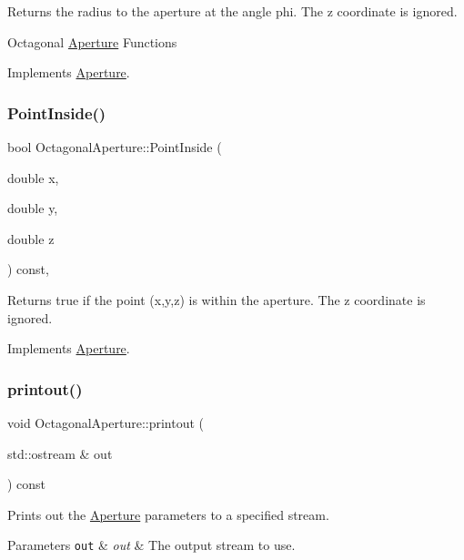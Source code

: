 Returns the radius to the aperture at the angle phi. The z coordinate is ignored.

Octagonal \hyperlink{classAperture}{Aperture} Functions 

Implements \hyperlink{classAperture_ad0ea7907d393ec1e6a8303343fe9dd29}{Aperture}.

\mbox{\label{classOctagonalAperture_a9c3e4ba8a96d3b97fc92fdeef975caf9}} 
\subsubsection{\texorpdfstring{Point\+Inside()}{PointInside()}}
{\footnotesize\ttfamily bool Octagonal\+Aperture\+::\+Point\+Inside (\begin{DoxyParamCaption}\item[{double}]{x,  }\item[{double}]{y,  }\item[{double}]{z }\end{DoxyParamCaption}) const\hspace{0.3cm}{\ttfamily [inline]}, {\ttfamily [virtual]}}

Returns true if the point (x,y,z) is within the aperture. The z coordinate is ignored. 

Implements \hyperlink{classAperture_a77854d058bf8a00cfeb7a6d766dc0028}{Aperture}.

\mbox{\label{classOctagonalAperture_ad8329324a912bc76c97fd3f8bbefa5ac}} 
\subsubsection{\texorpdfstring{printout()}{printout()}}
{\footnotesize\ttfamily void Octagonal\+Aperture\+::printout (\begin{DoxyParamCaption}\item[{std\+::ostream \&}]{out }\end{DoxyParamCaption}) const\hspace{0.3cm}{\ttfamily [virtual]}}

Prints out the \hyperlink{classAperture}{Aperture} parameters to a specified stream. 
\begin{DoxyParams}[1]{Parameters}
\mbox{\tt out}  & {\em out} & The output stream to use. \\
\hline
\end{DoxyParams}


